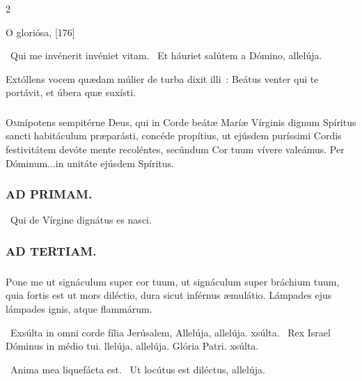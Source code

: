 \documentclass[9pt,twoside]{extarticle}
\begin{document}
\begin{multicols}{2}
{\begin{tightlist}{}
\item {} O gloriósa,  [176]
\item {}~Qui me invénerit invéniet vitam. ~Et háuriet salútem a Dómino, allelúja.
\item {} Extóllens vocem quædam múlier de turba dixit illi~: Beátus venter qui te portávit, et úbera quæ suxísti.
\end{tightlist}

\subsubsection*{\center {}}
\lettrine{O}mnípotens sempitérne Deus, qui in Corde beátæ Maríæ Vírginis dignum Spíritus sancti habitáculum præparásti, concéde propítius, ut ejúsdem puríssimi Cordis festivitátem devóte mente recoléntes, secúndum Cor tuum vívere valeámus. Per Dóminum...in unitáte ejúsdem Spíritus.

\begin{tightlist}{}
\item {}
\end{tightlist}

\subsubsection*{\center \textsc{AD PRIMAM.}}
\begin{tightlist}{}
\item {}~Qui de Vírgine dignátus es nasci.
\end{tightlist}

\subsubsection*{\center \textsc{AD TERTIAM.}}
\subsubsection*{}
\lettrine{P}one me ut signáculum super cor tuum, ut signáculum super bráchium tuum, quia fortis est ut mors diléctio, dura sicut inférnus æmulátio. Lámpades ejus lámpades ignis, atque flammárum.

\begin{tightlist}{}
\item {}~Exsúlta in omni corde fília Jerúsalem, \textred{*} Allelúja, allelúja. xsúlta.
~Rex Israel Dóminus in médio tui. llelúja, allelúja.
Glória Patri. xsúlta.
\item {}~Anima mea liquefácta est. ~Ut locútus est diléctus, allelúja.
\end{tightlist}


}
\end{multicols}
\end{document}
